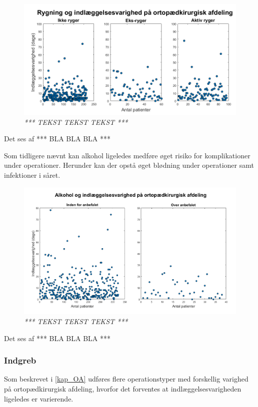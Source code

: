 \begin{figure}[H]
	\centering
	\includegraphics[scale=0.55]{figures/rygerogindlaeg}
	\caption{\textit{ *** TEKST TEKST TEKST *** }}
	\label{rygningogindlaeggelse}
\end{figure}


\noindent
Det ses af  *** BLA BLA BLA ***


Som tidligere nævnt kan alkohol ligeledes medføre øget risiko for komplikationer under operationer. Herunder kan der opstå øget blødning under operationer samt infektioner i såret.\cite{Nordjylland2014} 


\begin{figure}[H]
	\centering
	\includegraphics[scale=0.55]{figures/alkohologindlaeg}
	\caption{\textit{ *** TEKST TEKST TEKST *** }}
	\label{alkohologindlaeggelse}
\end{figure}


\noindent
Det ses af  *** BLA BLA BLA ***


\subsubsection{Indgreb}
Som beskrevet i \ref{kap_OA} udføres flere operationstyper med forskellig varighed på ortopædkirurgisk afdeling, hvorfor det forventes at indlæggelsesvarigheden ligeledes er varierende. 


